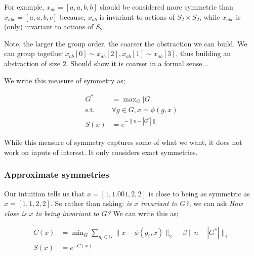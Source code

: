 
For example, $x_{ab} = [a,a,b,b]$ should be considered more symmetric than $x_{abc} = [a,a,b,c]$ because,
$x_{ab}$ is invariant to actions of $S_2 \times S_2$, while $x_{abc}$ is (only) invariant to actions of $S_2$.

Note, the larger the group order, the coarser the abstraction we can build. We can group together $x_{ab}[0] \sim x_{ab}[2], x_{ab}[1] \sim x_{ab}[3]$, thus building an abstraction of size $2$.
{\color{red}Should show it is coarser in a formal sense...}



We write this measure of symmetry as;

\begin{align*}
G^{* } &= \mathop{\text{max}}_G |G| \tag{pick the largest group}\\
\text{s.t.} \;\; &\forall g\in G, x = \phi(g, x) \tag{that $x$ is invariant to} \\
S(x) &= e^{-\parallel n-|G^{* }| \parallel_1} \tag{transform so $S(x)\in [0, 1]$}
\end{align*}

While this measure of symmetry captures some of what we want, it does not work on inputs of interest.
It only considers exact symmetries.

\subsubsection{Approximate symmetries}

Our intuition tells us that $x = [1,1.001,2,2]$ is close to being as symmetric as
$x = [1,1,2,2]$. So rather than asking: \textit{is $x$ invariant to $G$?}, we can ask
\textit{How close is $x$ to being invariant to $G$?} We can write this as;


\begin{align*}
C(x) &= \mathop{\text{min}}_G \sum_{g_i\in G}\parallel x-\phi(g_i, x)\parallel_2 - \beta \parallel n-|G^{* }| \parallel_1 \label{eq:sym-measure}\\
S(x) &= e^{-C(x)}
\end{align*}

